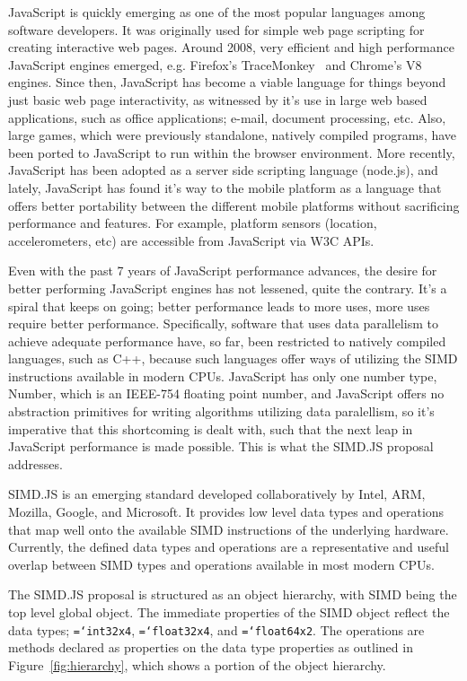 \documentclass[preprint]{sigplanconf}
\newcommand{\ttt}[1]{{\texttt{\hyphenchar\font=`\-\relax #1}}}%
\begin{document}
JavaScript is quickly emerging as one of the most popular languages among 
software developers.  It was originally used for simple web page scripting for 
creating interactive web pages. Around 2008, very efficient and high 
performance JavaScript engines emerged, e.g. Firefox's TraceMonkey~\cite{tracemonkey} and 
Chrome's V8 engines. Since then, JavaScript has become a viable language for 
things beyond just basic web page interactivity, as witnessed by it's use in 
large web based applications, such as office applications; e-mail, document 
processing, etc. Also, large games, which were previously standalone, natively
compiled programs, have been ported to JavaScript to run within the browser 
environment.  More recently, JavaScript has been adopted as a server side 
scripting language (node.js), and lately, JavaScript has found it's way to the
mobile platform as a language that offers better portability between the 
different mobile platforms without sacrificing performance and features.  For 
example, platform sensors (location, accelerometers, etc) are 
accessible from JavaScript via W3C APIs.

Even with the past 7 years of JavaScript performance advances, the desire for 
better performing JavaScript engines has not lessened, quite the contrary. It's
a spiral that keeps on going; better performance leads to more uses, more uses 
require better performance.  Specifically, software that uses data parallelism 
to achieve adequate performance have, so far, been restricted to natively 
compiled languages, such as C++, because such languages offer ways of utilizing 
the SIMD instructions available in modern CPUs.  JavaScript has only one number
type, Number, which is an IEEE-754 floating point number, and JavaScript offers 
no abstraction primitives for writing algorithms utilizing data paralellism, so 
it's imperative that this shortcoming is dealt with, such that the next leap
in JavaScript performance is made possible.  This is what the SIMD.JS proposal
addresses.

SIMD.JS is an emerging standard developed collaboratively by Intel, ARM,
Mozilla, Google, and Microsoft.  It provides low level data types and 
operations that map well onto the available SIMD instructions of the underlying 
hardware.  Currently, the defined data types and operations are a 
representative and useful overlap between SIMD types and operations available 
in most modern CPUs.

The SIMD.JS proposal is structured as an object hierarchy, with SIMD being the
top level global object.  The immediate properties of the SIMD object reflect
the data types; \ttt{int32x4}, \ttt{float32x4}, and \ttt{float64x2}.  The 
operations are methods declared as properties on the data type properties as 
outlined in  Figure~\ref{fig:hierarchy}, which shows a portion of the object 
hierarchy.
\end{document}
